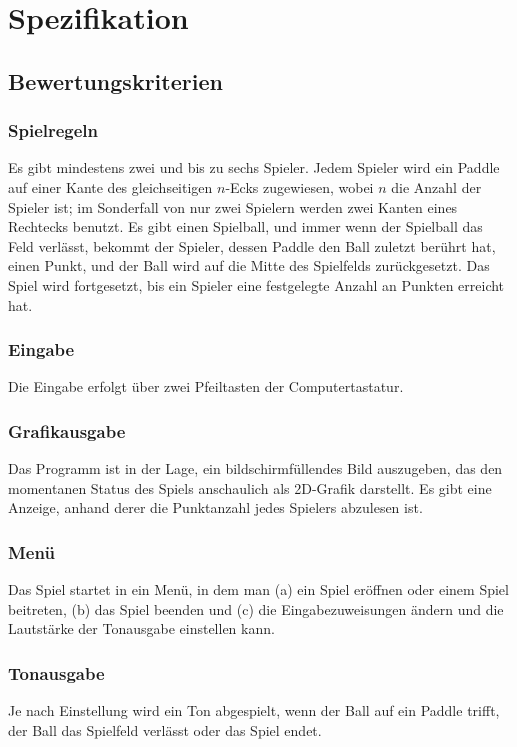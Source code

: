 \documentclass{homework-pp}
\date{\today}
\begin{document}
\makeheadline

\section{Spezifikation}


\subsection{Bewertungskriterien}
\subsubsection{Spielregeln}
Es gibt mindestens zwei und bis zu sechs Spieler. Jedem Spieler wird ein Paddle auf einer Kante des gleichseitigen $n$-Ecks zugewiesen, wobei $n$ die Anzahl der Spieler ist; im Sonderfall von nur zwei Spielern werden zwei Kanten eines Rechtecks benutzt. Es gibt einen Spielball, und immer wenn der Spielball das Feld verlässt, bekommt der Spieler, dessen Paddle den Ball zuletzt berührt hat, einen Punkt, und der Ball wird auf die Mitte des Spielfelds zurückgesetzt. Das Spiel wird fortgesetzt, bis ein Spieler eine festgelegte Anzahl an Punkten erreicht hat.
\subsubsection{Eingabe}
Die Eingabe erfolgt über zwei Pfeiltasten der Computertastatur.
\subsubsection{Grafikausgabe}
Das Programm ist in der Lage, ein bildschirmfüllendes Bild auszugeben, das den momentanen Status des Spiels anschaulich als 2D-Grafik darstellt. Es gibt eine Anzeige, anhand derer die Punktanzahl jedes Spielers abzulesen ist.
\subsubsection{Menü}
Das Spiel startet in ein Menü, in dem man (a) ein Spiel eröffnen oder einem Spiel beitreten, (b) das Spiel beenden und (c) die Eingabezuweisungen ändern und die Lautstärke der Tonausgabe einstellen kann.
\subsubsection{Tonausgabe}
Je nach Einstellung wird ein Ton abgespielt, wenn der Ball auf ein Paddle trifft, der Ball das Spielfeld verlässt oder das Spiel endet.
\end{document}

